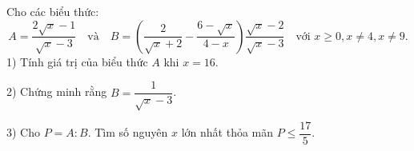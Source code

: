 
\begin{bt}
Cho các biểu thức:
\[
A = \dfrac{2\sqrt{x} - 1}{\sqrt{x} - 3} \quad \text{và} \quad B = \left( \dfrac{2}{\sqrt{x} + 2} - \dfrac{6 - \sqrt{x}}{4 - x} \right) \dfrac{\sqrt{x} - 2}{\sqrt{x} - 3} \quad \text{với } x \ge 0, x \ne 4, x \ne 9.
\]
1) Tính giá trị của biểu thức $A$ khi $x = 16$.

2) Chứng minh rằng $B = \dfrac{1}{\sqrt{x} - 3}$.

3) Cho $P = A : B$. Tìm số nguyên $x$ lớn nhất thỏa mãn $P \le \dfrac{17}{5}$.
\end{bt}
